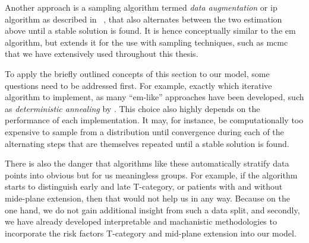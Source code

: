 \documentclass[\relativeRoot/main.tex]{subfiles}
\begin{document}
Another approach is a sampling algorithm termed \emph{data augmentation} or \gls{ip} algorithm as described in \citeauthor*{bishop_pattern_2006}~\cite[537]{bishop_pattern_2006}, that also alternates between the two estimation above until a stable solution is found. It is hence conceptually similar to the \gls{em} algorithm, but extends it for the use with sampling techniques, such as \gls{mcmc} that we have extensively used throughout this thesis.

To apply the briefly outlined concepts of this section to our model, some questions need to be addressed first. For example, exactly which iterative algorithm to implement, as many ``\gls{em}-like'' approaches have been developed, such as \emph{deterministic annealing} by . This choice also highly depends on the performance of each implementation. It may, for instance, be computationally too expensive to sample from a distribution until convergence during each of the alternating steps that are themselves repeated until a stable solution is found.

There is also the danger that algorithms like these automatically stratify data points into obvious but for us meaningless groups. For example, if the algorithm starts to distinguish early and late T-category, or patients with and without mide-plane extension, then that would not help us in any way. Because on the one hand, we do not gain additional insight from such a data split, and secondly, we have already developed interpretable and machanistic methodologies to incorporate the risk factors T-category and mid-plane extension into our model.
\end{document}
